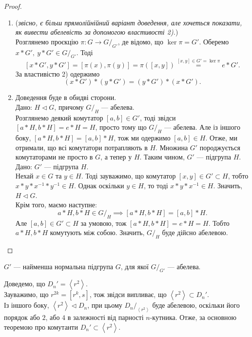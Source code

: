 \documentclass{math_library}
\begin{document}
\begin{proof}
\begin{enumerate}[topsep=0pt,wide=0pt,label={\arabic*)}]
\item (\textit{звісно, є більш прямолійнійний варіант доведення, але хочеться показати, як вивести абелевість за допомогою властивості 2).}) \\
Розглянемо проєкцію $\pi \colon G \to G/_{G'}$, де відомо, що $\ker \pi = G'$. Оберемо $x*G',\ y*G' \in G/_{G'}$. Тоді
\[
[x*G',y*G'] = [\pi(x), \pi(y)] = \pi([x,y]) \overset{[x,y] \in G' = \ker \pi}{=} e*G'.
\]
За властивістю 2) одержимо
\[
(x*G')*(y*G') = (y*G')*(x*G').
\]

\item Доведення буде в обидві сторони.\\
\rightproof Дано: $H \triangleleft G$, причому $G/_H$ --- абелева.\\
Розглянемо деякий комутатор $[a,b] \in G'$, тоді звідси $[a*H,b*H] = e*H = H$, просто тому що $G/_H$ --- абелева. Але із іншого боку, $[a*H,b*H] = [a,b]*H$, тож ми одержимо $[a,b] \in H$. Отже, ми отримали, що всі комутатори потрапляють в $H$. Множина $G'$ породжується комутаторами не просто в $G$, а тепер у $H$. Таким чином, $G'$ --- підгрупа $H$.
\bigskip \\
\leftproof Дано: $G'$ --- підгрупа $H$.\\
Нехай $x \in G$ та $y \in H$. Тоді зауважимо, що комутатор $[x,y] \in G' \subset H$, тобто $x*y*x^{-1}*y^{-1} \in H$. Однак оскільки $y \in H$, то тоді $x*y*x^{-1} \in H$. Значить, $H \triangleleft G$.\\
Крім того, маємо наступне:
\[
a*H,b*H \in G/_H \implies [a*H,b*H] = [a,b]*H.
\]
Але $[a,b] \in G' \subset H$ за умовою, тож $[a*H,b*H] = e*H = H$. Тобто $a*H,b*H$ комутують між собою. Значить, $G/_H$ буде дійсно абелевою. \qedhere
\end{enumerate}
\end{proof}

\begin{corollary}
$G'$ --- найменша нормальна підгрупа $G$, для якої $G/_{G'}$ --- абелева.
\end{corollary}

\begin{example}
Доведемо, що $D_n' = \left<r^2\right>$.
\bigskip \\
Зауважимо, що $r^{2k} = [r^k,s]$, тож звідси випливає, що $\left<r^2\right> \subset D_n'$.\\
Із іншого боку, $\left< r^2 \right> \triangleleft D_n$, при цьому $D_n/_{\left<r^2\right>}$ буде абелевою, оскільки його порядок або $2$, або $4$ в залежності від парності $n$-кутника. Отже, за основною теоремою про комутанти $D_n' \subset \left< r^2 \right>$.
\end{example}
\end{document}
